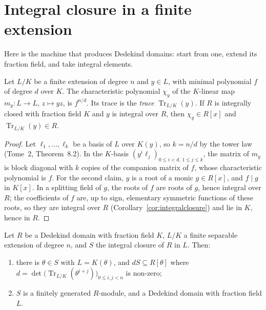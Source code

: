 \section{Integral closure in a finite extension}

Here is the machine that produces Dedekind domains: start from one, extend its fraction field, and take integral elements.

\begin{lemma}\label{lem:trace}
Let $L/K$ be a finite extension of degree $n$ and $y\in L$, with minimal polynomial $f$ of degree $d$ over $K$. The characteristic polynomial $\chi_y$ of the $K$-linear map $m_y\colon L\to L$, $z\mapsto yz$, is $f^{n/d}$. Its trace
is the \emph{trace} $\operatorname{Tr}_{L/K}(y)$. If $R$ is integrally closed with fraction field $K$ and $y$ is integral over $R$, then $\chi_y\in R[x]$ and $\operatorname{Tr}_{L/K}(y)\in R$.
\end{lemma}

\begin{proof}
Let $\ell_1,\dots,\ell_k$ be a basis of $L$ over $K(y)$, so $k=n/d$ by the tower law (Tome~2, Theorem~8.2). In the $K$-basis $(y^i\ell_j)_{0\le i<d,\,1\le j\le k}$, the matrix of $m_y$ is block diagonal with $k$ copies of the
companion matrix of $f$, whose characteristic polynomial is $f$. For the second claim, $y$ is a root of a monic $g\in R[x]$, and $f\mid g$ in $K[x]$. In a splitting field of $g$, the roots of $f$ are roots of $g$, hence integral
over $R$; the coefficients of $f$ are, up to sign, elementary symmetric functions of these roots, so they are integral over $R$ (Corollary~\ref{cor:integralclosure}) and lie in $K$, hence in $R$.
\end{proof}

\begin{theorem}\label{thm:intclosure}
Let $R$ be a Dedekind domain with fraction field $K$, $L/K$ a finite separable extension of degree $n$, and $S$ the integral closure of $R$ in $L$. Then:
\begin{enumerate}[label=(\alph*)]
\item there is $\theta\in S$ with $L=K(\theta)$, and $dS\subseteq R[\theta]$ where $d=\det\bigl(\operatorname{Tr}_{L/K}(\theta^{i+j})\bigr)_{0\le i,j<n}$ is non-zero;
\item $S$ is a finitely generated $R$-module, and a Dedekind domain with fraction field $L$.
\end{enumerate}
\end{theorem}

